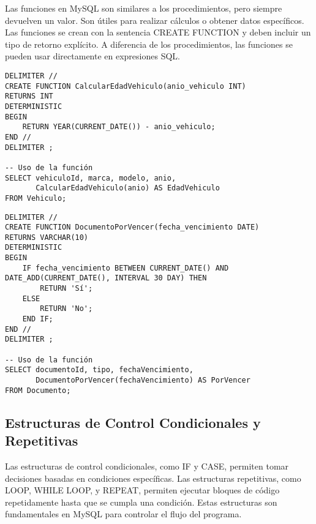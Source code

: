\documentclass{article}
\begin{document}
\textnormal{Las funciones en MySQL son similares a los procedimientos, pero siempre devuelven un valor. Son útiles para realizar cálculos o obtener datos específicos. Las funciones se crean con la sentencia CREATE FUNCTION y deben incluir un tipo de retorno explícito. A diferencia de los procedimientos, las funciones se pueden usar directamente en expresiones SQL.}

\begin{lstlisting}[style=sqlstyle]
    DELIMITER //
CREATE FUNCTION CalcularEdadVehiculo(anio_vehiculo INT) 
RETURNS INT
DETERMINISTIC
BEGIN
    RETURN YEAR(CURRENT_DATE()) - anio_vehiculo;
END //
DELIMITER ;

-- Uso de la función
SELECT vehiculoId, marca, modelo, anio, 
       CalcularEdadVehiculo(anio) AS EdadVehiculo 
FROM Vehiculo;
\end{lstlisting}

\begin{lstlisting}[style=sqlstyle]
    DELIMITER //
CREATE FUNCTION DocumentoPorVencer(fecha_vencimiento DATE) 
RETURNS VARCHAR(10)
DETERMINISTIC
BEGIN
    IF fecha_vencimiento BETWEEN CURRENT_DATE() AND DATE_ADD(CURRENT_DATE(), INTERVAL 30 DAY) THEN
        RETURN 'Sí';
    ELSE
        RETURN 'No';
    END IF;
END //
DELIMITER ;

-- Uso de la función
SELECT documentoId, tipo, fechaVencimiento, 
       DocumentoPorVencer(fechaVencimiento) AS PorVencer 
FROM Documento;
\end{lstlisting}

\subsection{Estructuras de Control Condicionales y Repetitivas}

\textnormal{Las estructuras de control condicionales, como IF y CASE, permiten tomar decisiones basadas en condiciones específicas. Las estructuras repetitivas, como LOOP, WHILE LOOP, y REPEAT, permiten ejecutar bloques de código repetidamente hasta que se cumpla una condición. Estas estructuras son fundamentales en MySQL para controlar el flujo del programa.}
\end{document}
